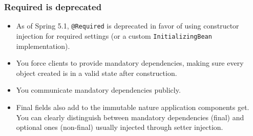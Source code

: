 \documentclass[10pt,xcolor=pdflatex, table]{beamer}
\begin{document}
\begin{frame}\frametitle{Required is deprecated}
	\begin{itemize}
		\item As of Spring 5.1, \texttt{@Required} is deprecated in favor of using constructor injection for required settings (or a custom \texttt{InitializingBean} implementation).
		\item You force clients to provide mandatory dependencies, making sure every object created is in a valid state after construction.
		\item You communicate mandatory dependencies publicly.
		\item Final fields also add to the immutable nature application components get. You can clearly distinguish between mandatory dependencies (final) and optional ones (non-final) usually injected through setter injection.
	\end{itemize}
\end{frame}
\end{document}
